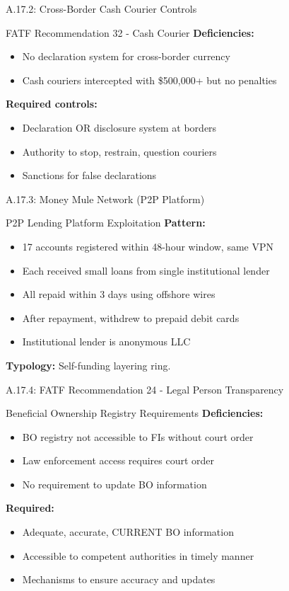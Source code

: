 \documentclass{beamer}
\begin{document}
\begin{frame}{A.17.2: Cross-Border Cash Courier Controls}
	\begin{block}{FATF Recommendation 32 - Cash Courier}
		\textbf{Deficiencies:}
		\begin{itemize}
			\item No declaration system for cross-border currency
			\item Cash couriers intercepted with \$500,000+ but no penalties
		\end{itemize}
		\textbf{Required controls:}
		\begin{itemize}
			\item Declaration OR disclosure system at borders
			\item Authority to stop, restrain, question couriers
			\item Sanctions for false declarations
		\end{itemize}
	\end{block}
\end{frame}

\begin{frame}{A.17.3: Money Mule Network (P2P Platform)}
	\begin{block}{P2P Lending Platform Exploitation}
		\textbf{Pattern:}
		\begin{itemize}
			\item 17 accounts registered within 48-hour window, same VPN
			\item Each received small loans from single institutional lender
			\item All repaid within 3 days using offshore wires
			\item After repayment, withdrew to prepaid debit cards
			\item Institutional lender is anonymous LLC
		\end{itemize}
		\textbf{Typology:} Self-funding layering ring.
	\end{block}
\end{frame}

\begin{frame}{A.17.4: FATF Recommendation 24 - Legal Person Transparency}
	\begin{block}{Beneficial Ownership Registry Requirements}
		\textbf{Deficiencies:}
		\begin{itemize}
			\item BO registry not accessible to FIs without court order
			\item Law enforcement access requires court order
			\item No requirement to update BO information
		\end{itemize}
		\textbf{Required:}
		\begin{itemize}
			\item Adequate, accurate, CURRENT BO information
			\item Accessible to competent authorities in timely manner
			\item Mechanisms to ensure accuracy and updates
		\end{itemize}
	\end{block}
\end{frame}
\end{document}
